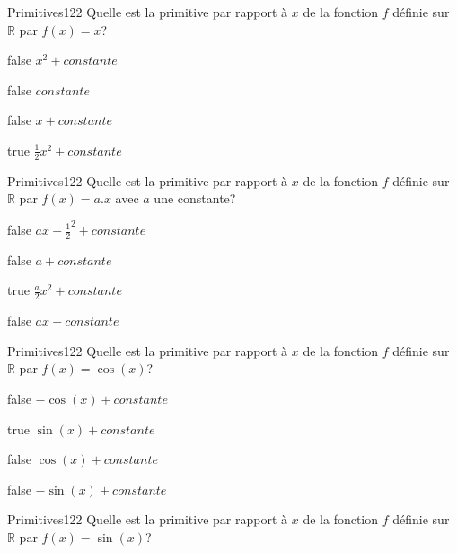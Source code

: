         	\begin{question}{61}{Primitives}{1}{22}
				Quelle est la primitive par rapport à $x$ de la fonction $f$ définie sur $\mathbb{R}$ par $f(x)=x$?
            \end{question}
            \begin{reponses}
            	\item[false] $x^2+constante$
            	\item[false] $constante$
                \item[false] $x+constante$
                \item[true] $\frac{1}{2}x^2+constante$
            \end{reponses}
        	\begin{question}{61}{Primitives}{1}{22}
				Quelle est la primitive par rapport à $x$ de la fonction $f$ définie sur $\mathbb{R}$ par $f(x)=a.x$ avec $a$ une constante?
            \end{question}
            \begin{reponses}
            	\item[false] $ax+\frac{1}{2}^2+constante$
            	\item[false] $a+constante$
                \item[true] $\frac{a}{2}x^2+constante$
                \item[false] $ax+constante$
            \end{reponses}
        	\begin{question}{61}{Primitives}{1}{22}
				Quelle est la primitive par rapport à $x$ de la fonction $f$ définie sur $\mathbb{R}$ par $f(x)=\cos(x)$?
            \end{question}
            \begin{reponses}
            	\item[false] $-\cos(x)+constante$
            	\item[true] $\sin(x)+constante$
                \item[false] $\cos(x)+constante$
                \item[false] $-\sin(x)+constante$
            \end{reponses}
        	\begin{question}{61}{Primitives}{1}{22}
				Quelle est la primitive par rapport à $x$ de la fonction $f$ définie sur $\mathbb{R}$ par $f(x)=\sin(x)$?
            \end{question}
